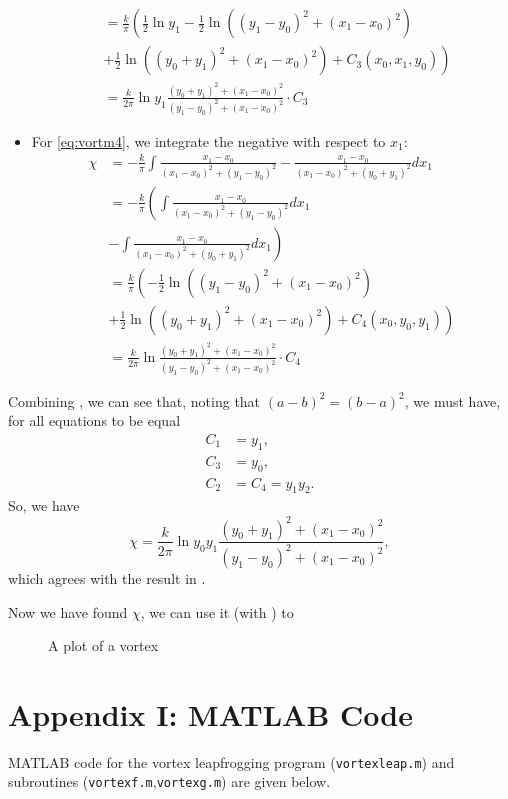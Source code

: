 \documentclass[10pt, a4paper]{article}
\numberwithin{equation}{section}
\newcommand{\inv}[1]{\frac{1}{#1}}
\newcommand{\half}{\frac{1}{2}}
\begin{document}
\begin{itemize}
\begin{align}
&= \frac{k}{\pi}\left(\inv{2} \ln y_1 -\half \ln((y_1-y_0)^2 +(x_1-x_0)^2)\right. \nonumber\\ &\left. + \half \ln((y_0+y_1)^2 +(x_1-x_0)^2) +C_3 (x_0,x_1,y_0)\right)\nonumber\\
&=\frac{k}{2\pi}\ln y_1 \frac{(y_0+y_1)^2 +(x_1-x_0)^2}{(y_1-y_0)^2 +(x_1-x_0)^2} \cdot C_3\label{eq:chi3}
\end{align} 
\item For \cref{eq:vortm4}, we integrate the negative with respect to $x_1$:
\begin{align}
\chi &=-\frac{k}{\pi}\int \frac{x_1-x_0}{(x_1-x_0)^2 + (y_1-y_0)^2} - \frac{x_1-x_0}{(x_1-x_0)^2 +(y_0+y_1)^2} dx_1\nonumber\\
&= -\frac{k}{\pi} \left( \int  \frac{x_1-x_0}{(x_1-x_0)^2 + (y_1-y_0)^2} dx_1\right. \nonumber\\ &\left.- \int \frac{x_1-x_0}{(x_1-x_0)^2 +(y_0+y_1)^2} dx_1 \right)\nonumber\\
&= \frac{k}{\pi}\left(-\half \ln((y_1-y_0)^2 +(x_1-x_0)^2)\right. \nonumber\\ &\left. + \half \ln((y_0+y_1)^2 +(x_1-x_0)^2) +C_4 (x_0,y_0,y_1)\right)\nonumber\\
&=\frac{k}{2\pi}\ln \frac{(y_0+y_1)^2 +(x_1-x_0)^2}{(y_1-y_0)^2 +(x_1-x_0)^2} \cdot C_4\label{eq:chi4}
\end{align}
\end{itemize}
Combining , we can see that, noting that $(a-b)^2 = (b-a)^2$, we must have, for all equations to be equal
\begin{align}
C_1&=y_1,\\
C_3&=y_0,\\
C_2&=C_4=y_1 y_2.
\end{align}
So, we have
\begin{equation}
\chi=\frac{k}{2\pi}\ln y_0 y_1 \frac{(y_0+y_1)^2 +(x_1-x_0)^2}{(y_1-y_0)^2 +(x_1-x_0)^2},
\label{eq:chifinal}
\end{equation}
which agrees with the result in \citet{love94}.

Now we have found $\chi$, we can use it (with ) to 
\begin{figure}
	\centering
	\newlength\figureheight 
	\newlength\figurewidth 
	\setlength\figureheight{10cm} 
	\setlength\figurewidth{\textwidth}
	
	\caption{A plot of a vortex}
	\label{fig:vortest}
\end{figure}
\clearpage
\section*{Appendix I: MATLAB Code}\label{sec:ap1}
MATLAB code for the vortex leapfrogging program (\texttt{vortexleap.m}\normalfont) and subroutines (\texttt{vortexf.m}\normalfont,\texttt{vortexg.m}) are given below.
\end{document}
